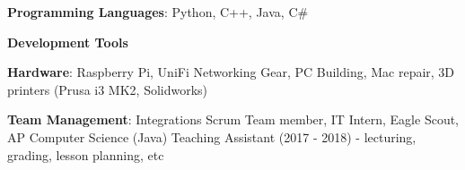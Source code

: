 

\begin{cventries}
\vspace{-5mm}
  \cventry
    {}
    {}
    {}
    {}
    {
      \begin{cvitems}
        \item {\textbf{Programming Languages}: Python, C++, Java, C\#}
        \item {\textbf{Development Tools}}
        \item {\textbf{Hardware}: Raspberry Pi, UniFi Networking Gear,
            PC Building, Mac repair, 3D printers (Prusa i3 MK2,
            Solidworks)}
        \item {\textbf{Team Management}:  Integrations Scrum Team
            member, IT Intern, Eagle Scout, AP Computer Science (Java) Teaching
            Assistant (2017 - 2018) - lecturing, grading, lesson
            planning, etc}
      \end{cvitems}
    }
\end{cventries}
